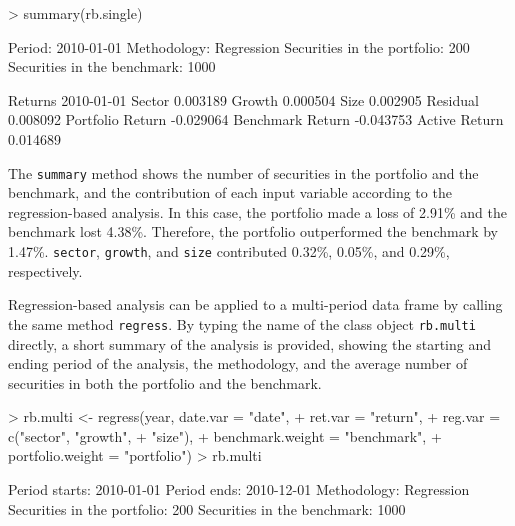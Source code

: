 \begin{Schunk}
\begin{Sinput}
> summary(rb.single)
\end{Sinput}
\begin{Soutput}
Period:                              2010-01-01
Methodology:                         Regression
Securities in the portfolio:         200
Securities in the benchmark:         1000

Returns 
                 2010-01-01
Sector             0.003189
Growth             0.000504
Size               0.002905
Residual           0.008092
Portfolio Return  -0.029064
Benchmark Return  -0.043753
Active Return      0.014689
\end{Soutput}
\end{Schunk}

The \texttt{summary} method shows the number of securities in the
portfolio and the benchmark, and the contribution of each input
variable according to the regression-based analysis. In this case, the
portfolio made a loss of 2.91\% and the benchmark lost
4.38\%. Therefore, the portfolio outperformed the benchmark by
1.47\%. \texttt{sector}, \texttt{growth}, and \texttt{size}
contributed 0.32\%, 0.05\%, and 0.29\%, respectively.

Regression-based analysis can be applied to a multi-period data frame
by calling the same method \texttt{regress}. By typing the name of the
class object \texttt{rb.multi} directly, a short summary of the
analysis is provided, showing the starting and ending period of the
analysis, the methodology, and the average number of securities in
both the portfolio and the benchmark.


\begin{Schunk}
\begin{Sinput}
> rb.multi <- regress(year, date.var = "date",
+                 ret.var = "return",
+                 reg.var = c("sector", "growth", 
+                   "size"),
+                 benchmark.weight = "benchmark",
+                 portfolio.weight = "portfolio")
> rb.multi
\end{Sinput}
\begin{Soutput}
Period starts:                       2010-01-01
Period ends:                         2010-12-01
Methodology:                         Regression
Securities in the portfolio:         200
Securities in the benchmark:         1000
\end{Soutput}
\end{Schunk}

